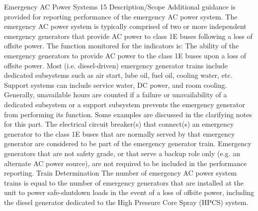Emergency AC Power Systems 15
Description/Scope
Additional guidance is provided for reporting performance of the emergency AC power system. The emergency AC power system is typically comprised of two or more independent emergency generators that provide AC power to class 1E buses following a loss of offsite power.
The function monitored for the indicators is:
The ability of the emergency generators to provide AC power to the class 1E buses upon a loss of offsite power.
Most (i.e. diesel-driven) emergency generator trains include dedicated subsystems such as air start, lube oil, fuel oil, cooling water, etc. Support systems can include service water, DC power, and room cooling. Generally, unavailable hours are counted if a failure or unavailability of a dedicated subsystem or a support subsystem prevents the emergency generator from performing its function. Some examples are discussed in the clarifying notes for this part.
The electrical circuit breaker(s) that connect(s) an emergency generator to the class 1E buses that are normally served by that emergency generator are considered to be part of the emergency generator train.
Emergency generators that are not safety grade, or that serve a backup role only (e.g. an alternate AC power source), are not required to be included in the performance reporting.
Train Determination
The number of emergency AC power system trains is equal to the number of emergency generators that are installed at the unit to power safe-shutdown loads in the event of a loss of offsite power, including the diesel generator dedicated to the High Pressure Core Spray (HPCS) system.


